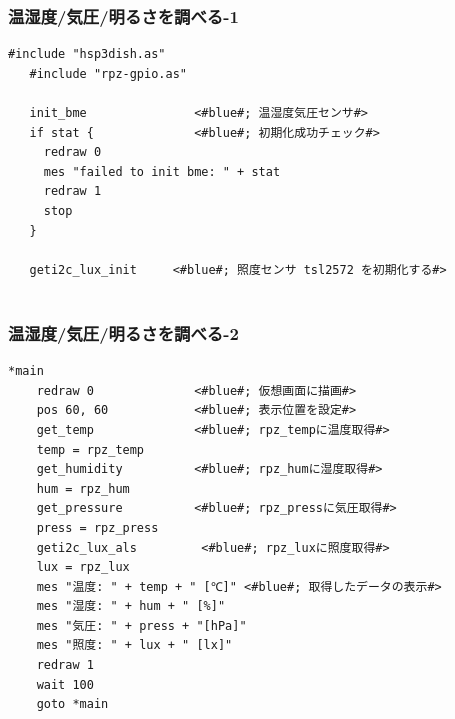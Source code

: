 


\begin{frame}[fragile]
  \frametitle{温湿度/気圧/明るさを調べる-1}
  \begin{lstlisting}[title=\sim/03/sensors.hsp 前半, label=sensors.hsp-1]
   #include "hsp3dish.as"    
   #include "rpz-gpio.as"    

   init_bme               <#blue#; 温湿度気圧センサ#>
   if stat {              <#blue#; 初期化成功チェック#>
     redraw 0          
     mes "failed to init bme: " + stat
     redraw 1
     stop
   }

   geti2c_lux_init     <#blue#; 照度センサ tsl2572 を初期化する#>
  
  \end{lstlisting}
\end{frame}

\begin{frame}[fragile]
  \frametitle{温湿度/気圧/明るさを調べる-2}
  \begin{lstlisting}[title=\sim/03/sensors.hsp 後半, label=sensors.hsp-2]
  *main
    redraw 0              <#blue#; 仮想画面に描画#>
    pos 60, 60            <#blue#; 表示位置を設定#>
    get_temp              <#blue#; rpz_tempに温度取得#>
    temp = rpz_temp       
    get_humidity          <#blue#; rpz_humに湿度取得#>
    hum = rpz_hum       
    get_pressure          <#blue#; rpz_pressに気圧取得#>
    press = rpz_press
    geti2c_lux_als         <#blue#; rpz_luxに照度取得#>
    lux = rpz_lux
    mes "温度: " + temp + " [℃]" <#blue#; 取得したデータの表示#>
    mes "湿度: " + hum + " [%]"
    mes "気圧: " + press + "[hPa]"
    mes "照度: " + lux + " [lx]"
    redraw 1              
    wait 100
    goto *main
  \end{lstlisting}
\end{frame}

